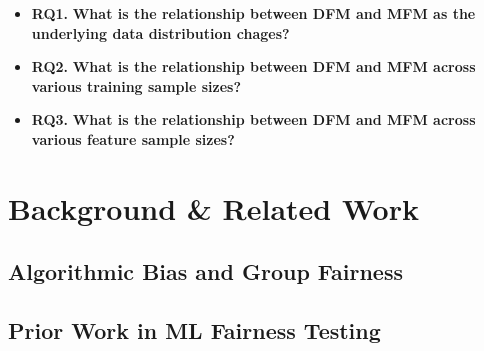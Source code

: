 \documentclass{article}
\begin{document}



\begin{itemize}
\item{\textbf{RQ1.}} \textbf{What is the relationship between DFM
  and MFM as the underlying data distribution chages?}
\item{\textbf{RQ2.}} \textbf{What is the relationship between DFM and
  MFM across various training sample sizes?}
\item{\textbf{RQ3.}} \textbf{What is the relationship between DFM and
  MFM across various feature sample sizes?}
\end{itemize}

\section{Background \& Related Work}\label{sec:related}

\subsection{Algorithmic Bias and Group Fairness}\label{sec:bias-fairnes}


\subsection{Prior Work in ML Fairness Testing}\label{sec:prior-work}
\end{document}
